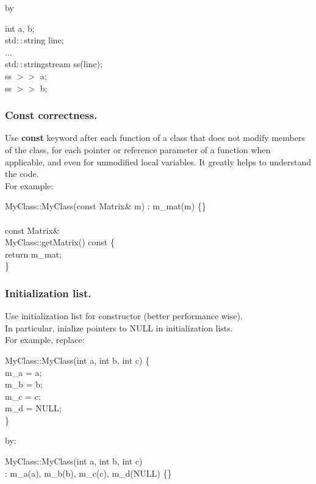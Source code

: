 by
\begin{algorithm}[H]
int a, b; \\
std$::$string line; \\
... \\
std$::$stringstream ss(line); \\
ss $>>$ a; \\
ss $>>$ b;
\end{algorithm}

\subsubsection{Const correctness.}
Use {\bf const} keyword after each function of a class that does not
modify members of the class, for each pointer or reference parameter
of a function when applicable, and even for unmodified local
variables. It greatly helps to understand the code.\\

For example:
\begin{algorithm}[H]
MyClass::MyClass(const Matrix\& m) : m\_mat(m) \{\} \\
 \\
const Matrix\& \\
MyClass::getMatrix() const \{ \\
return m\_mat; \\
\}
\end{algorithm}

\subsubsection{Initialization list.}
Use initialization list for constructor (better performance wise).\\
In particular, inialize pointers to NULL in initialization lists.\\ 

For example, replace:
\begin{algorithm}[H]
MyClass::MyClass(int a, int b, int c) \{ \\
m\_a = a; \\
m\_b = b; \\
m\_c = c; \\
m\_d = NULL; \\
\}
\end{algorithm}

by:
\begin{algorithm}[H]
MyClass::MyClass(int a, int b, int c) \\
: m\_a(a), m\_b(b), m\_c(c), m\_d(NULL) \{\}
\end{algorithm}

